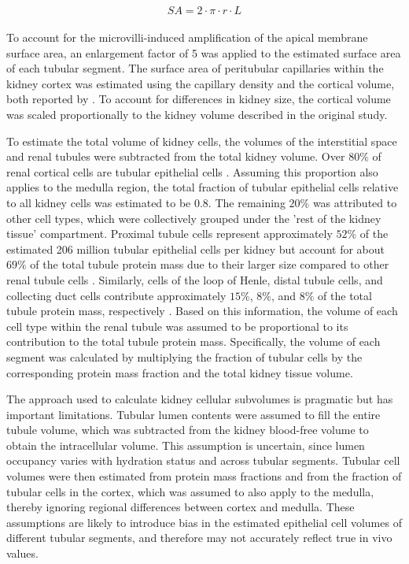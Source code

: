 \documentclass[preprint,12pt,authoryear]{elsarticle}
\begin{document}
\begin{align}
\begin{aligned}
SA =2\cdot \pi \cdot  r \cdot L
\end{aligned} 
\end{align}

To account for the microvilli-induced amplification of the apical membrane surface area, an enlargement factor of 5 was applied to the estimated surface area of each tubular segment. The surface area of peritubular capillaries within the kidney cortex was estimated using the capillary density and the cortical volume, both reported by \citet{gazzard_2025}. To account for differences in kidney size, the cortical volume was scaled proportionally to the kidney volume described in the original study. 

To estimate the total volume of kidney cells, the volumes of the interstitial space and renal tubules were subtracted from the total kidney volume. Over $80\%$ of renal cortical cells are tubular epithelial cells \citep{wang_2024}. Assuming this proportion also applies to the medulla region, the total fraction of tubular epithelial cells relative to all kidney cells was estimated to be 0.8. The remaining $20\%$ was attributed to other cell types, which were collectively grouped under the 'rest of the kidney tissue' compartment. Proximal tubule cells represent approximately $52\%$ of the estimated 206 million tubular epithelial cells per kidney but account for about $69\%$ of the total tubule protein mass due to their larger size compared to other renal tubule cells \citep{clark_2019}. Similarly, cells of the loop of Henle, distal tubule cells, and collecting duct cells contribute approximately $15\%$, $8\%$, and $8\%$ of the total tubule protein mass, respectively \citep{clark_2019}. Based on this information, the volume of each cell type within the renal tubule was assumed to be proportional to its contribution to the total tubule protein mass. Specifically, the volume of each segment was calculated by multiplying the fraction of tubular cells by the corresponding protein mass fraction and the total kidney tissue volume.

The approach used to calculate kidney cellular subvolumes is pragmatic but has important limitations. Tubular lumen contents were assumed to fill the entire tubule volume, which was subtracted from the kidney blood-free volume to obtain the intracellular volume. This assumption is uncertain, since lumen occupancy varies with hydration status and across tubular segments. Tubular cell volumes were then estimated from protein mass fractions and from the fraction of tubular cells in the cortex, which was assumed to also apply to the medulla, thereby ignoring regional differences between cortex and medulla. These assumptions are likely to introduce bias in the estimated epithelial cell volumes of different tubular segments, and therefore may not accurately reflect true in vivo values.
\end{document}
